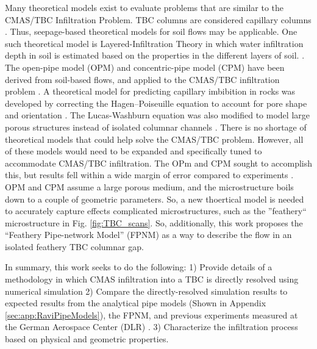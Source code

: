 \documentclass[%
 aip,
 amsmath,amssymb,
 reprint,%
]{revtex4-1}
\begin{document}
Many theoretical models exist to evaluate problems that are similar to the CMAS/TBC Infiltration Problem. TBC columns are considered capillary columns \cite{Naraparaju2017}. Thus, seepage-based theoretical models for soil flows may be applicable. One such theoretical model is Layered-Infiltration Theory in which water infiltration depth in soil is estimated based on the properties in the different layers of soil. \cite{ZHAO2024100028}. The open-pipe model (OPM) and concentric-pipe model (CPM) have been derived from soil-based flows, and applied to the CMAS/TBC infiltration problem \cite{CARMAN1997S32, Chapuis2003616, Naraparaju2019}. A theoretical model for predicting capillary imbibition in rocks was developed by correcting the Hagen–Poiseuille equation to account for pore shape and orientation \cite{Benavente2002}. The Lucas-Washburn equation was also modified to model large porous structures instead of isolated columnar channels \cite{Cai2021}. There is no shortage of theoretical models that could help solve the CMAS/TBC problem. However, all of these models would need to be expanded and specifically tuned to accommodate CMAS/TBC infiltration. The OPm and CPM sought to accomplish this, but results fell within a wide margin of error compared to experiments \cite{Naraparaju2019}. OPM and CPM assume a large porous medium, and the microstructure boils down to a couple of geometric parameters. So, a new thoertical model is needed to accurately capture effects complicated microstructures, such as the ''feathery`` microstructure in Fig. \ref{fig:TBC_scans}. So, additionally, this work proposes the ``Feathery Pipe-network Model'' (FPNM) as a way to describe the flow in an isolated feathery TBC columnar gap. 



In summary, this work seeks to do the following: 1) Provide details of a methodology in which CMAS infiltration into a TBC is directly resolved using numerical simulation 2) Compare the directly-resolved simulation results to expected results from the analytical pipe models \cite{Naraparaju2019} (Shown in Appendix \ref{sec:app:RaviPipeModels}), the FPNM, and previous experiments measured at the German Aerospace Center (DLR) \cite{Naraparaju2019}. 3) Characterize the infiltration process based on physical and geometric properties.
\end{document}
